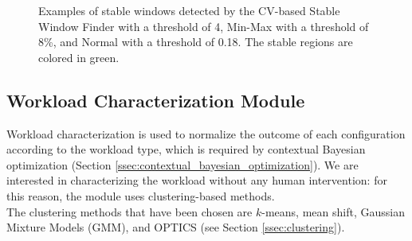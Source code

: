 \documentclass[a4paper, 12pt]{article} %
\begin{document}
\begin{figure}\centering
	\hfill 
	\hfill
	
	\caption{Examples of stable windows detected by the CV-based Stable Window Finder with a threshold of 4, Min-Max with a threshold of 8\%, and Normal with a threshold of 0.18. The stable regions are colored in green.}
	\label{fig:threshold_selection}
\end{figure}


	
	\subsection{Workload Characterization Module}  \label{ssec:workload_characterization_module}
	Workload characterization is used to normalize the outcome of each configuration according to the workload type, which is required by contextual Bayesian optimization (Section \ref{ssec:contextual_bayesian_optimization}). We are interested in characterizing the workload without any human intervention: for this reason, the module uses clustering-based methods. \\
	The clustering methods that have been chosen are $k$-means, mean shift, Gaussian Mixture Models (GMM), and OPTICS (see Section \ref{ssec:clustering}).
	
\end{document}
